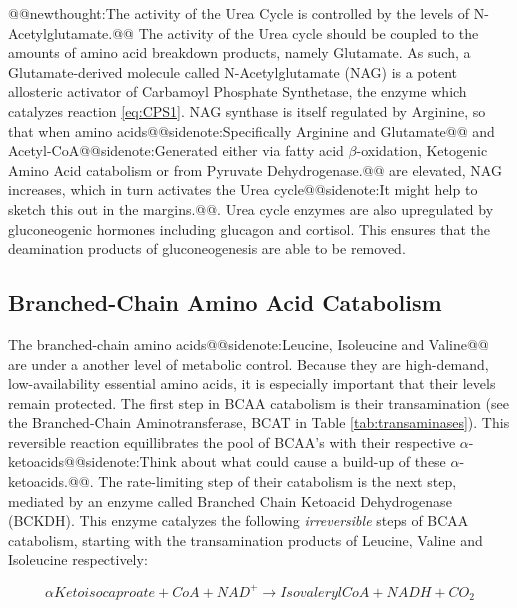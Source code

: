 \documentclass{tufte-handout}
\makeatletter
\def\newthought#1{@@newthought:#1@@}
\def\sidenote#1{@@sidenote:#1@@}
\makeatother
\begin{document}
\newthought{The activity of the Urea Cycle is controlled by the levels of N-Acetylglutamate.}  The activity of the Urea cycle should be coupled to the amounts of amino acid breakdown products, namely Glutamate.  As such, a Glutamate-derived molecule called N-Acetylglutamate (NAG) is a potent allosteric activator of Carbamoyl Phosphate Synthetase, the enzyme which catalyzes reaction \ref{eq:CPS1}.  NAG synthase is itself regulated by Arginine, so that when amino acids\sidenote{Specifically Arginine and Glutamate} and Acetyl-CoA\sidenote{Generated either via fatty acid $\beta$-oxidation, Ketogenic Amino Acid catabolism or from Pyruvate Dehydrogenase.} are elevated, NAG increases, which in turn activates the Urea cycle\sidenote{It might help to sketch this out in the margins.}.  Urea cycle enzymes are also upregulated by gluconeogenic hormones including glucagon and cortisol.  This ensures that the deamination products of gluconeogenesis are able to be removed.

\subsection{Branched-Chain Amino Acid Catabolism}

The branched-chain amino acids\sidenote{Leucine, Isoleucine and Valine} are under a another level of metabolic control.  Because they are high-demand, low-availability essential amino acids, it is especially important that their levels remain protected.  The first step in BCAA catabolism is their transamination (see the Branched-Chain Aminotransferase, BCAT in Table \ref{tab:transaminases}).  This reversible reaction equillibrates the pool of BCAA's with their respective $\alpha$-ketoacids\sidenote{Think about what could cause a build-up of these $\alpha$-ketoacids.}.  The rate-limiting step of their catabolism is the next step, mediated by an enzyme called Branched Chain Ketoacid Dehydrogenase (BCKDH).  This enzyme catalyzes the following \emph{irreversible} steps of BCAA catabolism, starting with the transamination products of Leucine, Valine and Isoleucine respectively:

\begin{equation}\label{eq:leu}
\alpha Ketoisocaproate + CoA + NAD^+ \rightarrow IsovalerylCoA + NADH + CO_2
\end{equation}
\end{document}
